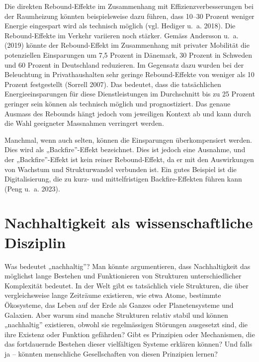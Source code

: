\documentclass[
  nswissgerman,
  a4paper,
  openany]{book}
\begin{document}
Die direkten Rebound-Effekte im Zusammenhang mit Effizienzverbesserungen
bei der Raumheizung könnten beispielsweise dazu führen, dass 10--30
Prozent weniger Energie eingespart wird als technisch möglich (vgl.
Hediger u.~a. 2018). Die Rebound-Effekte im Verkehr variieren noch
stärker. Gemäss Andersson u.~a. (2019) könnte der Rebound-Effekt im
Zusammenhang mit privater Mobilität die potenziellen Einsparungen um 7,5
Prozent in Dänemark, 30 Prozent in Schweden und 60 Prozent in
Deutschland reduzieren. Im Gegensatz dazu wurden bei der Beleuchtung in
Privathaushalten sehr geringe Rebound-Effekte von weniger als 10 Prozent
festgestellt (Sorrell 2007). Das bedeutet, dass die tatsächlichen
Energieeinsparungen für diese Dienstleistungen im Durchschnitt bis zu 25
Prozent geringer sein können als technisch möglich und prognostiziert.
Das genaue Ausmass des Rebounds hängt jedoch vom jeweiligen Kontext ab
und kann durch die Wahl geeigneter Massnahmen verringert werden.

Manchmal, wenn auch selten, können die Einsparungen überkompensiert
werden. Dies wird als „Backfire''-Effekt bezeichnet. Dies ist jedoch
eine Ausnahme, und der „Backfire''-Effekt ist kein reiner
Rebound-Effekt, da er mit den Auswirkungen von Wachstum und
Strukturwandel verbunden ist. Ein gutes Beispiel ist die
Digitalisierung, die zu kurz- und mittelfristigen Backfire-Effekten
führen kann (Peng u.~a. 2023).

\section{Nachhaltigkeit als wissenschaftliche
Disziplin}\label{nachhaltigkeit-als-wissenschaftliche-disziplin}

Was bedeutet „nachhaltig''? Man könnte argumentieren, dass
Nachhaltigkeit das möglichst lange Bestehen und Funktionieren von
Strukturen unterschiedlicher Komplexität bedeutet. In der Welt gibt es
tatsächlich viele Strukturen, die über vergleichsweise lange Zeiträume
existieren, wie etwa Atome, bestimmte Ökosysteme, das Leben auf der Erde
als Ganzes oder Planetensysteme und Galaxien. Aber warum sind manche
Strukturen relativ stabil und können „nachhaltig'' existieren, obwohl
sie regelmässigen Störungen ausgesetzt sind, die ihre Existenz oder
Funktion gefährden? Gibt es Prinzipien oder Mechanismen, die das
fortdauernde Bestehen dieser vielfältigen Systeme erklären können? Und
falls ja -- könnten menschliche Gesellschaften von diesen Prinzipien
lernen?
\end{document}
